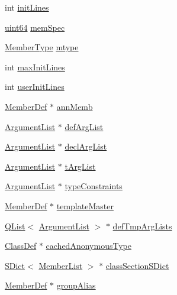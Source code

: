 \begin{DoxyCompactItemize}
\item 
int \hyperlink{class_member_def_impl_a2569d1dfbb86f22035b2c29f449ba031}{init\+Lines}
\item 
\hyperlink{qglobal_8h_a29940ae63ec06c9998bba873e25407ad}{uint64} \hyperlink{class_member_def_impl_a862beca5ed5f6e59cd2f6ad6e7bfc2bd}{mem\+Spec}
\item 
\hyperlink{types_8h_a63e3de542c5d38de617ab78c8c8f5a41}{Member\+Type} \hyperlink{class_member_def_impl_abd9a11ddd6535fd27e1557f3c179df41}{mtype}
\item 
int \hyperlink{class_member_def_impl_ac2fbabd78b82e04a290d0d5c54b3b37a}{max\+Init\+Lines}
\item 
int \hyperlink{class_member_def_impl_a42ce43bf816a71053f083e1ca3a43320}{user\+Init\+Lines}
\item 
\hyperlink{class_member_def}{Member\+Def} $\ast$ \hyperlink{class_member_def_impl_a5254b501e625d4128d4b4746254ae5a7}{ann\+Memb}
\item 
\hyperlink{class_argument_list}{Argument\+List} $\ast$ \hyperlink{class_member_def_impl_a1898d617ffa6e325ee27a92bba71e51e}{def\+Arg\+List}
\item 
\hyperlink{class_argument_list}{Argument\+List} $\ast$ \hyperlink{class_member_def_impl_ad87b77f6e6f285e7dbd1ce31e9da0f78}{decl\+Arg\+List}
\item 
\hyperlink{class_argument_list}{Argument\+List} $\ast$ \hyperlink{class_member_def_impl_aafedc0435689a4a24f626b3b72dc5fdd}{t\+Arg\+List}
\item 
\hyperlink{class_argument_list}{Argument\+List} $\ast$ \hyperlink{class_member_def_impl_af6c704ee3bde90fe74f057226a64e437}{type\+Constraints}
\item 
\hyperlink{class_member_def}{Member\+Def} $\ast$ \hyperlink{class_member_def_impl_a41e84ba9611b6003693dc8bbd7200dd1}{template\+Master}
\item 
\hyperlink{class_q_list}{Q\+List}$<$ \hyperlink{class_argument_list}{Argument\+List} $>$ $\ast$ \hyperlink{class_member_def_impl_a4d00872de77e13c3b707b4a8db704aad}{def\+Tmp\+Arg\+Lists}
\item 
\hyperlink{class_class_def}{Class\+Def} $\ast$ \hyperlink{class_member_def_impl_a288b263aa2d14e016ab6f930816fad9d}{cached\+Anonymous\+Type}
\item 
\hyperlink{class_s_dict}{S\+Dict}$<$ \hyperlink{class_member_list}{Member\+List} $>$ $\ast$ \hyperlink{class_member_def_impl_af5ddb8894600c2e9d2d05b8803f64e6e}{class\+Section\+S\+Dict}
\item 
\hyperlink{class_member_def}{Member\+Def} $\ast$ \hyperlink{class_member_def_impl_ab0c6a9476261e8bf1959262956c6b65b}{group\+Alias}

\end{DoxyCompactItemize}
